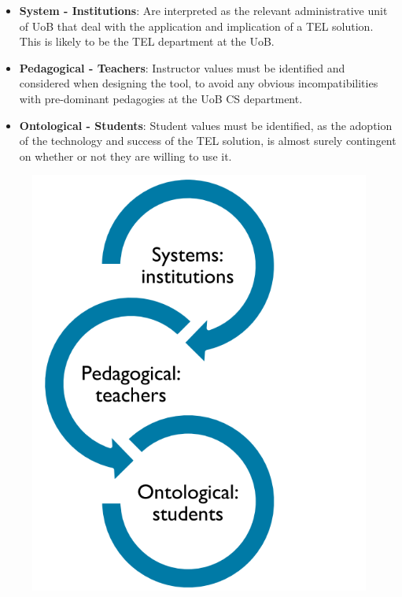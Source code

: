 \begin{itemize}

\item \textbf{System - Institutions}: Are interpreted as the relevant administrative unit of UoB that deal with the application and implication of a TEL solution. This is likely to be the TEL department at the UoB.

\item \textbf{Pedagogical - Teachers}: Instructor values must be identified and considered when designing the tool, to avoid any obvious incompatibilities with pre-dominant pedagogies at the UoB CS department.

\item \textbf{Ontological - Students}: Student values must be identified, as the adoption of the technology and success of the TEL solution, is almost surely contingent on whether or not they are willing to use it.

\end{itemize}

\begin{figure}[H]
	\centering
	\includegraphics[scale=0.5]{figures/flex}
	\label{fig:The Three Levels of Flexibility}
\end{figure}

